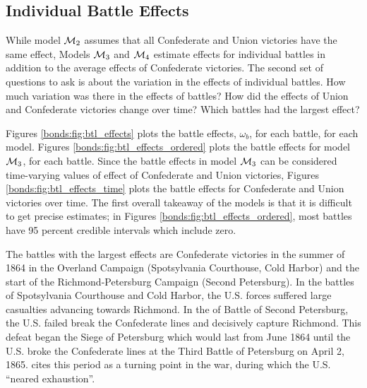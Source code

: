 \subsection{Individual Battle Effects}
\label{sec:indiv-effects-battl}

While model $\mathcal{M}_{\text{2}}$ assumes that all Confederate and Union victories have the same effect, Models $\mathcal{M}_{\text{3}}$ and $\mathcal{M}_{\text{4}}$ estimate effects for individual battles in addition to the average effects of Confederate victories.
The second set of questions to ask is about the variation in the effects of individual battles.
How much variation was there in the effects of battles? 
How did the  effects of Union and Confederate victories change over time?
Which battles had the largest effect? 

Figures \ref{bonds:fig:btl_effects} plots the battle effects, $\omega_{b}$, for each battle, for each model.
Figures \ref{bonds:fig:btl_effects_ordered} plots the battle effects for model $\mathcal{M}_{\text{3}}$, for each battle.
Since the battle effects in model $\mathcal{M}_{\text{3}}$ can be considered time-varying values of effect of Confederate and Union victories, Figures \ref{bonds:fig:btl_effects_time} plots the battle effects for Confederate and Union victories over time. 
The first overall takeaway of the models is that it is difficult to get precise estimates; in Figures \ref{bonds:fig:btl_effects_ordered}, most battles have 95 percent credible intervals which include zero.

The battles with the largest effects are Confederate victories in the summer of 1864 in the Overland Campaign (Spotsylvania Courthouse, Cold Harbor) and the start of the Richmond-Petersburg Campaign (Second Petersburg).
In the battles of Spotsylvania Courthouse and Cold Harbor, the U.S. forces suffered large casualties advancing towards Richmond.
In the of Battle of Second Petersburg, the U.S. failed break the Confederate lines and decisively capture Richmond.
This defeat began the Siege of Petersburg which would last from June 1864 until the U.S. broke the Confederate lines at the Third Battle of Petersburg on April 2, 1865.
\textcite[151-152]{Reiter2009} cites this period as a turning point in the war, during which the U.S. ``neared exhaustion''.

